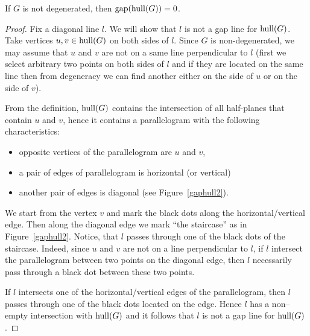 \begin{lemma}
If $G$ is not degenerated, then $\operatorname{gap}(\operatorname{hull}(G)) = 0$.
\label{lem:gap_hull_0}
\end{lemma}
\begin{proof}
Fix a diagonal line $l$. We will show that $l$ is not a gap line for $\operatorname{hull}(G)$.
Take vertices $u, v \in \operatorname{hull}(G)$ on both sides of $l$.
Since $G$ is non-degenerated, we may assume that $u$ and $v$ are not on a same line perpendicular to $l$ (first we select arbitrary two points on both sides of $l$ and if they are located on the same line then from degeneracy we can find another either on the side of $u$ or on the side of $v$).

From the definition, $\operatorname{hull}(G)$ contains the intersection of all half-planes that contain $u$ and $v$, hence it contains a parallelogram with the following characteristics:
\begin{itemize}
\item opposite vertices of the parallelogram are $u$ and $v$,
\item a pair of edges of parallelogram is horizontal (or vertical)
\item another pair of edges is diagonal (see Figure~\ref{gaphull2}).
\end{itemize}

\noindent
   \begin{minipage}[l]{0.45\textwidth}
	   
   \end{minipage}%
   \hfill
   \begin{minipage}[r]{0.5\textwidth} 
We start from the vertex $v$ and mark the black dots along the horizontal/vertical edge. Then along the diagonal edge we mark ``the staircase'' as in Figure~\ref{gaphull2}. Notice, that $l$ passes through one of the black dots of the staircase. Indeed, since $u$ and $v$ are not on a line perpendicular to $l$, if $l$ intersect the parallelogram between two points on the diagonal edge, then $l$ necessarily pass through a black dot between these two points. 
\end{minipage}

If $l$ intersects one of the horizontal/vertical edges of the parallelogram, then $l$ passes through one of the black dots located on the edge.  
Hence $l$ has a non--empty intersection with $\operatorname{hull}(G)$ and it follows that $l$ is not a gap line for $\operatorname{hull}(G)$.
\end{proof}
